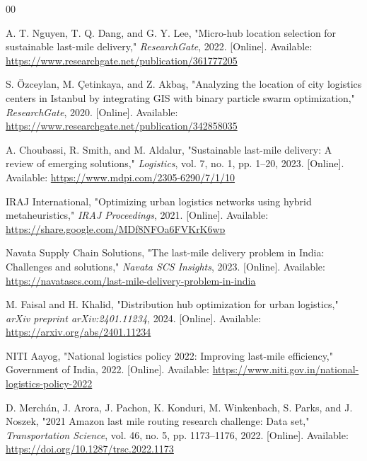 \documentclass[conference]{IEEEtran}
\begin{document}
\begin{thebibliography}{00}

A. T. Nguyen, T. Q. Dang, and G. Y. Lee,
"Micro-hub location selection for sustainable last-mile delivery,"
\textit{ResearchGate}, 2022. [Online]. Available:
\url{https://www.researchgate.net/publication/361777205}

S. Özceylan, M. Çetinkaya, and Z. Akbaş,
"Analyzing the location of city logistics centers in Istanbul by integrating GIS with binary particle swarm optimization,"
\textit{ResearchGate}, 2020. [Online]. Available:
\url{https://www.researchgate.net/publication/342858035}

A. Choubassi, R. Smith, and M. Aldalur,
"Sustainable last-mile delivery: A review of emerging solutions,"
\textit{Logistics}, vol. 7, no. 1, pp. 1–20, 2023. [Online]. Available:
\url{https://www.mdpi.com/2305-6290/7/1/10}

IRAJ International,
"Optimizing urban logistics networks using hybrid metaheuristics,"
\textit{IRAJ Proceedings}, 2021. [Online]. Available:
\url{https://share.google.com/MDf8NFOa6FVKrK6wp}

Navata Supply Chain Solutions,
"The last-mile delivery problem in India: Challenges and solutions,"
\textit{Navata SCS Insights}, 2023. [Online]. Available:
\url{https://navatascs.com/last-mile-delivery-problem-in-india}

M. Faisal and H. Khalid,
"Distribution hub optimization for urban logistics,"
\textit{arXiv preprint arXiv:2401.11234}, 2024. [Online]. Available:
\url{https://arxiv.org/abs/2401.11234}

NITI Aayog,
"National logistics policy 2022: Improving last-mile efficiency,"
Government of India, 2022. [Online]. Available:
\url{https://www.niti.gov.in/national-logistics-policy-2022}

D. Merchán, J. Arora, J. Pachon, K. Konduri, M. Winkenbach, S. Parks, and J. Noszek,
"2021 Amazon last mile routing research challenge: Data set,"
\textit{Transportation Science}, vol. 46, no. 5, pp. 1173–1176, 2022. [Online]. Available:
\url{https://doi.org/10.1287/trsc.2022.1173}

\end{thebibliography}

\clearpage
\end{document}
